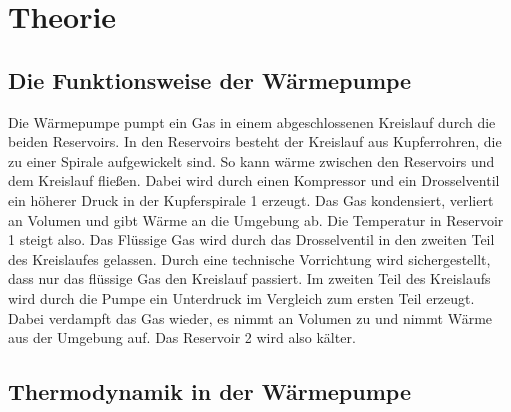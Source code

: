 \section{Theorie}

\subsection{Die Funktionsweise der Wärmepumpe} %
\label{sec:funktionsweise}
Die Wärmepumpe pumpt ein Gas in einem abgeschlossenen Kreislauf durch die beiden Reservoirs.
In den Reservoirs besteht der Kreislauf aus Kupferrohren, die zu einer Spirale aufgewickelt sind.
So kann wärme zwischen den Reservoirs und dem Kreislauf fließen.
Dabei wird durch einen Kompressor und ein Drosselventil ein höherer Druck in der Kupferspirale 1 erzeugt.
Das Gas kondensiert,  verliert an Volumen und gibt Wärme an die Umgebung ab.
Die Temperatur in Reservoir 1 steigt also. 
Das Flüssige Gas wird durch das Drosselventil in den zweiten Teil des Kreislaufes gelassen.
Durch eine technische Vorrichtung wird sichergestellt, dass nur das flüssige Gas den Kreislauf passiert.
Im zweiten Teil des Kreislaufs wird durch die Pumpe ein Unterdruck im Vergleich zum ersten Teil erzeugt.
Dabei verdampft das Gas wieder, es nimmt an Volumen zu und nimmt Wärme aus der Umgebung auf.
Das Reservoir 2 wird also kälter.

\subsection{Thermodynamik in der Wärmepumpe}

